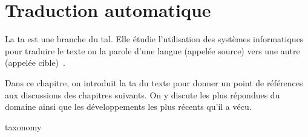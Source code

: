 \chapter{Traduction automatique}


La \acrfull{ta} est une branche du \acrfull{tal}.
Elle étudie l'utilisation des systèmes informatiques pour traduire le texte ou la parole d'une langue (appelée source) vers une autre (appelée cible)~\cite{routledge}.

Dans ce chapitre, on introduit la \acrlong{ta} du texte pour donner un point de références aux discussions des chapitres suivants.
On y discute les plus répondues du domaine 
ainsi que les développements les plus récents qu'il a vécu.

{taxonomy}